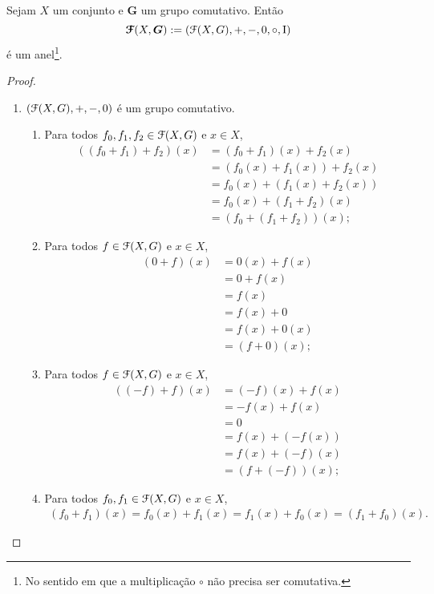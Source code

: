 \begin{proposition}
Sejam $X$ um conjunto e $\bm G$ um grupo comutativo. Então
	\begin{equation*}
	\bm{\mathcal{F}}(X,\bm G) := (\mathcal{F}(X,G),+,-,0,\circ,\mathrm{I})
	\end{equation*}
é um anel\footnote{No sentido em que a multiplicação $\circ$ não precisa ser comutativa.}.
\end{proposition}
\begin{proof}
	\begin{enumerate}
	\item $(\mathcal{F}(X,G),+,-,0)$ é um grupo comutativo.
		\begin{enumerate}
		\item Para todos $f_0,f_1,f_2 \in \mathcal{F}(X,G)$ e $x \in X$,
			\begin{align*}
			((f_0+f_1)+f_2)(x) &= (f_0+f_1)(x)+f_2(x) \\
				&= (f_0(x)+f_1(x))+f_2(x) \\
				&= f_0(x)+(f_1(x)+f_2(x)) \\
				&= f_0(x)+(f_1+f_2)(x) \\
				&= (f_0+(f_1+f_2))(x);
			\end{align*}
		\item Para todos $f \in \mathcal{F}(X,G)$ e $x \in X$,
			\begin{align*}
			(0+f)(x) &= 0(x)+f(x) \\
				&= 0+f(x) \\
				&= f(x) \\
				&= f(x)+0 \\
				&= f(x)+0(x) \\
				&= (f+0)(x);
			\end{align*}
		\item Para todos $f \in \mathcal{F}(X,G)$ e $x \in X$,
			\begin{align*}
			((-f)+f)(x) &= (-f)(x)+f(x) \\
				&= -f(x)+f(x) \\
				&= 0 \\
				&= f(x)+(-f(x)) \\
				&= f(x) + (-f)(x) \\
				&= (f+(-f))(x);				
			\end{align*}
		\item Para todos $f_0,f_1 \in \mathcal{F}(X,G)$ e $x \in X$,
			\begin{align*}
			(f_0+f_1)(x) = f_0(x)+f_1(x) = f_1(x) + f_0(x) = (f_1+f_0)(x).
			\end{align*}
		\end{enumerate}
	

\end{enumerate}
\end{proof}

